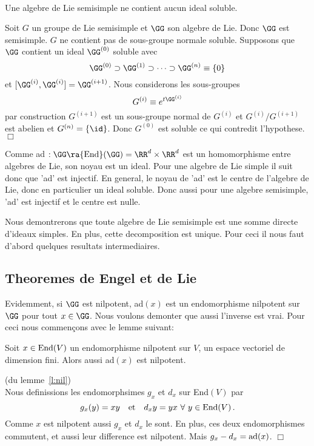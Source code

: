 \begin{ppp}~\label{p:1ss} \\
Une algebre de Lie   semisimple ne contient aucun ideal soluble.\end{ppp}
\begin{prv}
Soit $G$ un groupe de Lie  semisimple et $\GG$ son algebre de Lie. Donc $\GG$ est  semisimple. 
$G$ ne contient pas de sous-groupe normale soluble. 
Supposons que $\GG$ contient un ideal $\GG^{(0)}$ soluble avec
$$ \GG^{(0)} \supset \GG^{(1)} \supset \cdots  \supset \GG^{(n)}\equiv\{0\} $$
et $[\GG^{(i)},\GG^{(i)}] = \GG^{(i+1)}$. Nous considerons les sous-groupes
$$ G^{(i)}\equiv e^{t\GG^{(i)}}$$
par construction $G^{(i+1)}$ est un sous-groupe normal de $G^{(i)}$ et $G^{(i)}/G^{(i+1)}$ 
est abelien et $G^{(n)} =\{\id\} $.
Donc $G^{(0)}$ est soluble ce qui contredit l'hypothese. \hfill $\Box$
\end{prv}
Comme ad $: \GG \ra {\rm End}(\GG) = \RR^d\times \RR^d$ est un homomorphisme entre algebres de Lie,
son noyau est un ideal. Pour une algebre de Lie simple il suit donc que 'ad' est injectif. En general,
le noyau de 'ad' est le centre de l'algebre de Lie, donc en particulier un ideal soluble. Donc aussi pour une
algebre  semisimple, 'ad' est injectif et le centre est nulle. 

Nous demontrerons que toute algebre de Lie  semisimple est une somme directe d'ideaux simples.
En plus, cette decomposition est unique.
Pour ceci il nous faut d'abord quelques resultats intermediaires.

\subsection{Theoremes de Engel et de Lie}

Evidemment, si $\GG$ est nilpotent, ad$(x)$ est un endomorphisme nilpotent sur $\GG$ pour tout $x\in\GG$. Nous voulons demonter que aussi l'inverse est vrai. Pour ceci nous commen\c{c}ons avec le lemme suivant:

\begin{lem} \label{l:nil} Soit $x\in {\rm End}(V)$ un endomorphisme nilpotent sur $V$, un espace 
vectoriel de dimension fini. Alors aussi ad$(x)$ est nilpotent.
\end{lem}
\begin{prv}(du lemme~\ref{l:nil})\\
Nous definissions les endomorphsimes $g_x$ et $d_x$ sur End$(V)$ par
$$ g_x(y)  = xy \quad \mbox{et} \quad d_xy = yx ~\forall~ y\in {\rm End}(V) \,.$$
Comme $x$ est nilpotent aussi $g_x$ et $d_x$ le sont. En plus, ces deux endomorphismes commutent, 
et aussi leur difference est nilpotent. Mais $g_x -d_x = {\rm ad}(x)$. \hfill $\Box$
\end{prv}

